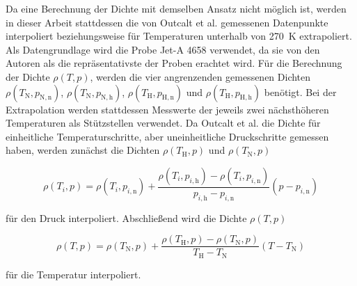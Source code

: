 Da eine Berechnung der Dichte mit demselben Ansatz nicht möglich ist, werden in dieser Arbeit stattdessen die von Outcalt et al. \cite{Outcalt.2009} gemessenen Datenpunkte interpoliert beziehungsweise für Temperaturen unterhalb von \SI{270}{\K} extrapoliert. Als Datengrundlage wird die Probe Jet-A 4658 verwendet, da sie von den Autoren als die repräsentativste der Proben erachtet wird. Für die Berechnung der Dichte $\rho(T,p)$, werden die vier angrenzenden gemessenen Dichten $\rho(T_\mathrm{N},p_{\mathrm{N,n}})$, $\rho(T_\mathrm{N},p_{\mathrm{N,h}})$, $\rho(T_\mathrm{H},p_{\mathrm{H,n}})$ und $\rho(T_\mathrm{H},p_{\mathrm{H,h}})$ benötigt. Bei der Extrapolation werden stattdessen Messwerte der jeweils zwei nächsthöheren Temperaturen als Stützstellen verwendet. Da Outcalt et al. die Dichte für einheitliche Temperaturschritte, aber uneinheitliche Druckschritte gemessen haben, werden zunächst die Dichten $\rho(T_\mathrm{H}, p)$ und $\rho(T_\mathrm{N}, p)$ 

\begin{equation}\label{Eq:pressure-interp}
    \rho(T_i, p)= \rho(T_i, p_{i,\mathrm{n}}) + \frac{\rho(T_i, p_{i,\mathrm{h}})-\rho(T_i, p_{i,\mathrm{n}})}{p_{i,\mathrm{h}}-p_{i,\mathrm{n}}}(p-p_{i,\mathrm{n}}) 
\end{equation}

für den Druck interpoliert. Abschließend wird die Dichte $\rho(T,p)$

\begin{equation}\label{Eq:temperature-interp}
    \rho(T, p)= \rho(T_\mathrm{N}, p) + \frac{\rho(T_\mathrm{H}, p)-\rho(T_\mathrm{N}, p)}{T_\mathrm{H}-T_\mathrm{N}}(T-T_\mathrm{N}) 
\end{equation}

für die Temperatur interpoliert. 